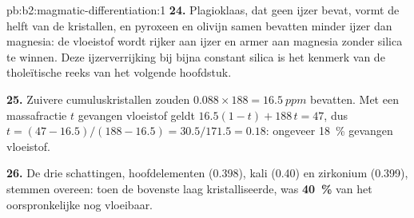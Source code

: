 \begin{solution}{pb:b2:magmatic-differentiation:1}
\textbf{24.} Plagioklaas, dat geen ijzer bevat, vormt de helft van de kristallen, en
pyroxeen en olivijn samen bevatten minder ijzer dan magnesia: de vloeistof
wordt rijker aan ijzer en armer aan magnesia zonder silica te winnen. Deze
ijzerverrijking bij bijna constant silica is het kenmerk van de tholeïtische reeks van het
volgende hoofdstuk.

\textbf{25.} Zuivere cumuluskristallen zouden $0.088\times188 = \qty{16.5}{ppm}$ bevatten. Met een
massafractie $t$ gevangen vloeistof geldt $16.5(1 - t) + 188\,t = 47$, dus $t = (47 -
16.5)/(188 - 16.5) = 30.5/171.5 = 0.18$: ongeveer \qty{18}{\percent} gevangen vloeistof.

\textbf{26.} De drie schattingen, hoofdelementen (0.398), kali (0.40) en
zirkonium (0.399), stemmen overeen: toen de bovenste laag kristalliseerde, was
\textbf{\qty[text-series-to-math=true]{40}{\percent}} van het oorspronkelijke 
nog vloeibaar.
\end{solution}
